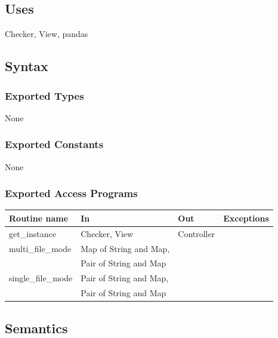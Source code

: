 \documentclass[12pt]{article}
\begin{document}
\subsection* {Uses}

Checker, View, pandas

\subsection* {Syntax}

\subsubsection* {Exported Types}

None

\subsubsection* {Exported Constants}

None

\subsubsection* {Exported Access Programs}

\begin{tabular}{| l | l | l | p{4.7cm} |}
\hline
\textbf{Routine name} & \textbf{In} & \textbf{Out} & \textbf{Exceptions}\\
\hline
get\_instance & Checker, View & Controller & \\
\hline
multi\_file\_mode & Map of String and Map, & &\\
                  & Pair of String and Map & & \\
\hline
single\_file\_mode & Pair of String and Map, & &\\
                   & Pair of String and Map & & \\
\hline
\end{tabular}

\subsection* {Semantics}
\end{document}
